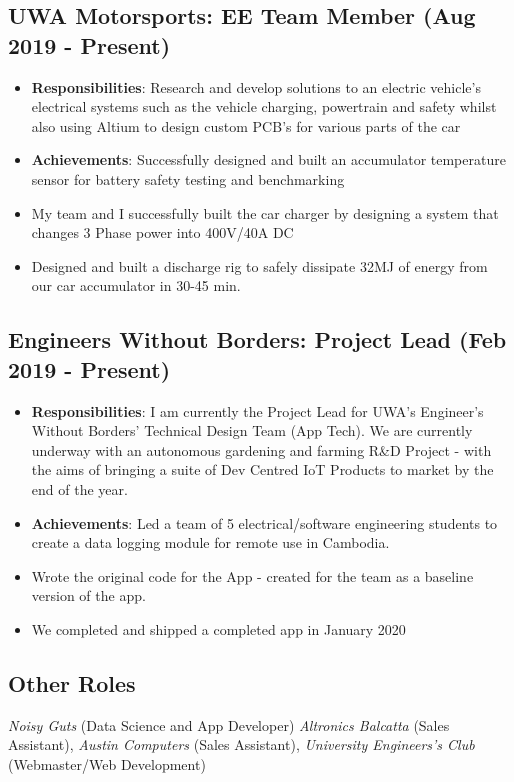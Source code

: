 \documentclass{article}[a4page]
\begin{document}
\subsection*{UWA Motorsports: EE Team Member \hfill (Aug 2019 - Present)}
\begin{itemize}
\item \textbf{Responsibilities}: Research and develop solutions to an electric vehicle’s electrical systems such as the vehicle charging, powertrain and safety whilst also using Altium to design custom PCB’s for various parts of the car
\item \textbf{Achievements}: Successfully designed and built an accumulator temperature sensor for battery safety testing and benchmarking
\item My team and I successfully built the car charger by designing a system that changes 3 Phase power into 400V/40A DC
\item Designed and built a discharge rig to safely dissipate 32MJ of energy from our car accumulator in 30-45 min.
\end{itemize}

\subsection*{Engineers Without Borders: Project Lead \hfill (Feb 2019 - Present)}
\begin{itemize}
\item \textbf{Responsibilities}: I am currently the Project Lead for UWA's Engineer's Without Borders' Technical Design Team (App Tech). We are currently underway with an autonomous gardening and farming R\&D Project - with the aims of bringing a suite of Dev Centred IoT Products to market by the end of the year.
\item \textbf{Achievements}: Led a team of 5 electrical/software engineering students to create a data logging module for remote use in Cambodia.
\item Wrote the original code for the App - created for the team as a baseline version of the app. 
\item We completed and shipped a completed app in January 2020
\end{itemize}

\subsection*{Other Roles}
\emph{Noisy Guts} (Data Science and App Developer) \emph{Altronics Balcatta} (Sales Assistant), \emph{Austin Computers} (Sales Assistant), \emph{University Engineers’s Club} (Webmaster/Web Development)
\end{document}
